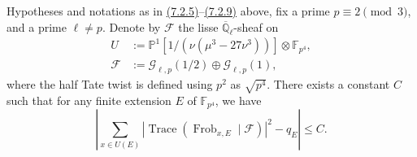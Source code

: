 Hypotheses and notations as in \hyperref[par:7.2.5]{(7.2.5)}--\hyperref[par:7.2.9]{(7.2.9)} above, fix a prime \(p\equiv 2\pmod 3\), and a prime \(\ell\ne p\). Denote by \(\mathcal{F}\) the lisse \(\overline{\mathbb{Q}}_\ell\)-sheaf on
\[
\begin{aligned}
U&:=\mathbb{P}^1[1/(\nu(\mu^3-27\nu^3))]\otimes\mathbb{F}_{p^4},\\
\mathcal{F}&:=\mathcal{G}_{\ell,p}(1/2)\oplus\mathcal{G}_{\ell,p}(1),
\end{aligned}
\]
where the half Tate twist is defined using \(p^2\) as \(\sqrt{p^4}\). There exists a constant \(C\) such that for any finite extension \(E\) of \(\mathbb{F}_{p^4}\), we have
\[
\tag{*}
\left|\sum_{x\in U(E)}|\operatorname{Trace}(\operatorname{Frob}_{x,E}\mid\mathcal{F})|^2-q_E\right|\leq C.
\]
